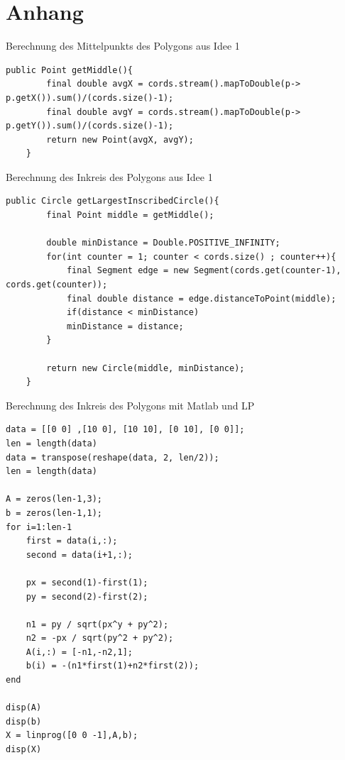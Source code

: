 \documentclass[conference]{IEEEtran}
\begin{document}
	\section{Anhang}
	Berechnung des Mittelpunkts des Polygons aus Idee 1
	\begin{lstlisting}[basicstyle=\tiny]
	public Point getMiddle(){
		final double avgX = cords.stream().mapToDouble(p-> p.getX()).sum()/(cords.size()-1);
		final double avgY = cords.stream().mapToDouble(p-> p.getY()).sum()/(cords.size()-1);
		return new Point(avgX, avgY);
	}
	\end{lstlisting}
	Berechnung des Inkreis des Polygons aus Idee 1
	\begin{lstlisting}[basicstyle=\tiny]
	public Circle getLargestInscribedCircle(){
		final Point middle = getMiddle();
		
		double minDistance = Double.POSITIVE_INFINITY;
		for(int counter = 1; counter < cords.size() ; counter++){
			final Segment edge = new Segment(cords.get(counter-1), cords.get(counter));
			final double distance = edge.distanceToPoint(middle);
			if(distance < minDistance)
			minDistance = distance;
		}
		
		return new Circle(middle, minDistance);
	}
	\end{lstlisting} 
 	Berechnung des Inkreis des Polygons mit Matlab und LP
\begin{lstlisting}[basicstyle=\tiny]
data = [[0 0] ,[10 0], [10 10], [0 10], [0 0]];
len = length(data)
data = transpose(reshape(data, 2, len/2));
len = length(data)

A = zeros(len-1,3);
b = zeros(len-1,1);
for i=1:len-1
	first = data(i,:);
	second = data(i+1,:);
	
	px = second(1)-first(1);
	py = second(2)-first(2);
	
	n1 = py / sqrt(px^y + py^2);
	n2 = -px / sqrt(py^2 + py^2);
	A(i,:) = [-n1,-n2,1];
	b(i) = -(n1*first(1)+n2*first(2));
end

disp(A)
disp(b)
X = linprog([0 0 -1],A,b);
disp(X)
\end{lstlisting}  
\end{document}
